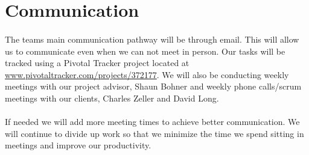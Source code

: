 \section{Communication}
\paragraph{} The teams main communication pathway will be through email. This will allow us to communicate even when we can not meet in person. Our tasks will be tracked using a Pivotal Tracker project located at \href{https://www.pivotaltracker.com/projects/372177}{www.pivotaltracker.com/projects/372177}. We will also be conducting weekly meetings with our project advisor, Shaun Bohner and weekly phone calls/scrum meetings with our clients, Charles Zeller and David Long.
\paragraph{} If needed we will add more meeting times to achieve better communication. We will continue to divide up work so that we minimize the time we spend sitting in meetings and improve our productivity.